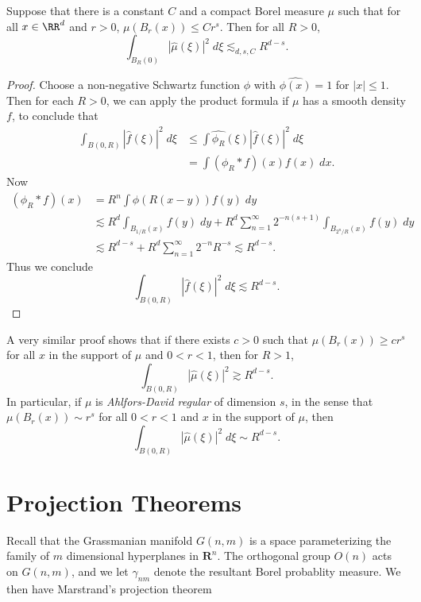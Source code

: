 \begin{theorem}
	Suppose that there is a constant $C$ and a compact Borel measure $\mu$ such that for all $x \in \RR^d$ and $r > 0$, $\mu(B_r(x)) \leq C r^s$. Then for all $R > 0$,
	\[ \int_{B_R(0)} |\widehat{\mu}(\xi)|^2\; d\xi \lesssim_{d,s,C} R^{d-s}. \]
\end{theorem}
\begin{proof}
	Choose a non-negative Schwartz function $\phi$ with $\widehat{\phi(x)} = 1$ for $|x| \leq 1$. Then for each $R > 0$, we can apply the product formula if $\mu$ has a smooth density $f$, to conclude that
	\begin{align*}
		\int_{B(0,R)} |\widehat{f}(\xi)|^2\; d\xi &\leq \int \widehat{\phi_R}(\xi) |\widehat{f}(\xi)|^2\; d\xi\\
		&= \int (\phi_R * f)(x) f(x)\; dx.
	\end{align*}
	Now
	\begin{align*}
		(\phi_R * f)(x) &= R^n \int \phi(R(x-y)) f(y)\; dy\\
		&\lesssim R^d \int_{B_{1/R}(x)} f(y)\; dy + R^d \sum_{n = 1}^\infty 2^{-n(s + 1)} \int_{B_{2^n/R}(x)} f(y)\; dy\\
		&\lesssim R^{d-s} + R^d \sum_{n = 1}^\infty 2^{-n} R^{-s} \lesssim R^{d-s}.
	\end{align*}
	Thus we conclude
	\[ \int_{B(0,R)} |\widehat{f}(\xi)|^2\; d\xi \lesssim R^{d-s}. \]
\end{proof}

\begin{remark}
	A very similar proof shows that if there exists $c > 0$ such that $\mu(B_r(x)) \geq c r^s$ for all $x$ in the support of $\mu$ and $0 < r < 1$, then for $R > 1$,
	\[ \int_{B(0,R)} |\widehat{\mu}(\xi)|^2 \gtrsim R^{d-s}. \]
	In particular, if $\mu$ is \emph{Ahlfors-David regular} of dimension $s$, in the sense that $\mu(B_r(x)) \sim r^s$ for all $0 < r < 1$ and $x$ in the support of $\mu$, then
	\[ \int_{B(0,R)} |\widehat{\mu}(\xi)|^2\; d\xi \sim R^{d-s}. \]
\end{remark}

\section{Projection Theorems}

Recall that the Grassmanian manifold $G(n,m)$ is a space parameterizing the family of $m$ dimensional hyperplanes in $\mathbf{R}^n$. The orthogonal group $O(n)$ acts on $G(n,m)$, and we let $\gamma_{nm}$ denote the resultant Borel probablity measure. We then have Marstrand's projection theorem

